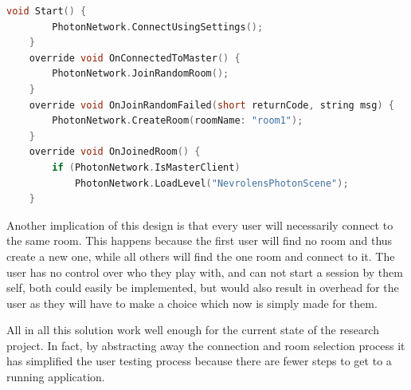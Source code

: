 \begin{lstlisting}[language=c, label={item:photonconnect}, caption={The connect process in a Unity \texttt{MonoBehaviour} written in C\#. }]
    void Start() {
        PhotonNetwork.ConnectUsingSettings();
    }
    override void OnConnectedToMaster() {
        PhotonNetwork.JoinRandomRoom(); 
    }
    override void OnJoinRandomFailed(short returnCode, string msg) {
        PhotonNetwork.CreateRoom(roomName: "room1"); 
    }
    override void OnJoinedRoom() {
        if (PhotonNetwork.IsMasterClient)
            PhotonNetwork.LoadLevel("NevrolensPhotonScene");
    }
\end{lstlisting}

Another implication of this design is that every user will necessarily connect to the same room. This happens because the first user will find no room and thus create a new one, while all others will find the one room and connect to it. The user has no control over who they play with, and can not start a session by them self, both could easily be implemented, but would also result in overhead for the user as they will have to make a choice which now is simply made for them.

All in all this solution work well enough for the current state of the research project. In fact, by abstracting away the connection and room selection process it has simplified the user testing process because there are fewer steps to get to a running application. 



